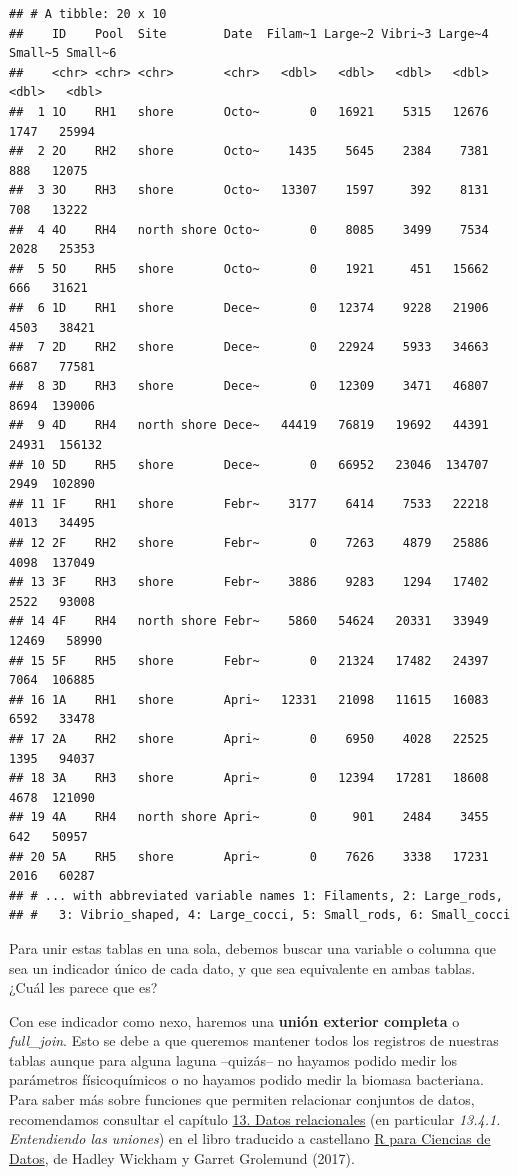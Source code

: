 \documentclass[
]{book}
\begin{document}
\begin{verbatim}
## # A tibble: 20 x 10
##    ID    Pool  Site        Date  Filam~1 Large~2 Vibri~3 Large~4 Small~5 Small~6
##    <chr> <chr> <chr>       <chr>   <dbl>   <dbl>   <dbl>   <dbl>   <dbl>   <dbl>
##  1 1O    RH1   shore       Octo~       0   16921    5315   12676    1747   25994
##  2 2O    RH2   shore       Octo~    1435    5645    2384    7381     888   12075
##  3 3O    RH3   shore       Octo~   13307    1597     392    8131     708   13222
##  4 4O    RH4   north shore Octo~       0    8085    3499    7534    2028   25353
##  5 5O    RH5   shore       Octo~       0    1921     451   15662     666   31621
##  6 1D    RH1   shore       Dece~       0   12374    9228   21906    4503   38421
##  7 2D    RH2   shore       Dece~       0   22924    5933   34663    6687   77581
##  8 3D    RH3   shore       Dece~       0   12309    3471   46807    8694  139006
##  9 4D    RH4   north shore Dece~   44419   76819   19692   44391   24931  156132
## 10 5D    RH5   shore       Dece~       0   66952   23046  134707    2949  102890
## 11 1F    RH1   shore       Febr~    3177    6414    7533   22218    4013   34495
## 12 2F    RH2   shore       Febr~       0    7263    4879   25886    4098  137049
## 13 3F    RH3   shore       Febr~    3886    9283    1294   17402    2522   93008
## 14 4F    RH4   north shore Febr~    5860   54624   20331   33949   12469   58990
## 15 5F    RH5   shore       Febr~       0   21324   17482   24397    7064  106885
## 16 1A    RH1   shore       Apri~   12331   21098   11615   16083    6592   33478
## 17 2A    RH2   shore       Apri~       0    6950    4028   22525    1395   94037
## 18 3A    RH3   shore       Apri~       0   12394   17281   18608    4678  121090
## 19 4A    RH4   north shore Apri~       0     901    2484    3455     642   50957
## 20 5A    RH5   shore       Apri~       0    7626    3338   17231    2016   60287
## # ... with abbreviated variable names 1: Filaments, 2: Large_rods,
## #   3: Vibrio_shaped, 4: Large_cocci, 5: Small_rods, 6: Small_cocci
\end{verbatim}

Para unir estas tablas en una sola, debemos buscar una variable o columna que sea un indicador único de cada dato, y que sea equivalente en ambas tablas. ¿Cuál les parece que es?

Con ese indicador como nexo, haremos una \textbf{unión exterior completa} o \emph{full\_join}. Esto se debe a que queremos mantener todos los registros de nuestras tablas aunque para alguna laguna --quizás-- no hayamos podido medir los parámetros físicoquímicos o no hayamos podido medir la biomasa bacteriana. Para saber más sobre funciones que permiten relacionar conjuntos de datos, recomendamos consultar el capítulo \href{http://es.r4ds.hadley.nz/datos-relacionales.html}{13. Datos relacionales} (en particular \emph{13.4.1. Entendiendo las uniones}) en el libro traducido a castellano \href{http://es.r4ds.hadley.nz/}{R para Ciencias de Datos}, de Hadley Wickham y Garret Grolemund (2017).
\end{document}
